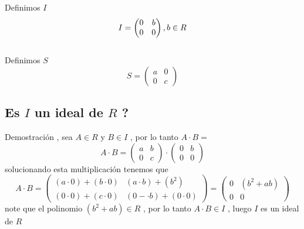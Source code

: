 \documentclass[10pt,a4paper]{article} %
\begin{document}
        Definimos $ I  $
        \begin{equation}
            I = \begin{pmatrix}
                0 & b
                \\
                0 & 0
            \end{pmatrix}
            \\
             , b \in R
        \end{equation}
        \\
        Definimos $ S  $
        \begin{equation}
            S = \begin{pmatrix}
                a & 0
                \\
                0 & c
            \end{pmatrix}
        \end{equation}

        \subsection{Es $ I  $ un ideal de $ R  $  ?}
            Demostración , sea $ A \in R  $  y $ B \in I  $  , por lo tanto $ A
            \cdot B  =  $
            \begin{equation}
                A \cdot  B = \begin{pmatrix}
                    a & b
                    \\
                    0 & c
                \end{pmatrix}
                \cdot
                \begin{pmatrix}
                    0 & b
                    \\
                    0 & 0
                \end{pmatrix}
            \end{equation}
            solucionando esta multiplicación tenemos que
            \begin{equation}
                A \cdot B = \begin{pmatrix}
                    (a \cdot 0) + (b \cdot 0) & (a \cdot b )+ (b ^{2} )
                    \\
                    (0 \cdot 0)+(c \cdot 0) & (0- \cdot b) + (0 \cdot 0)
                \end{pmatrix} =
                \begin{pmatrix}
                    0 & (b ^{2} + ab)
                    \\
                    0 & 0
                \end{pmatrix}
            \end{equation}
            note que el polinomio $ (b ^{2}  + ab)  \in R $ , por lo tanto $ A \cdot B \in I
            $ , luego $ I  $ es un ideal de $ R  $
\end{document}
